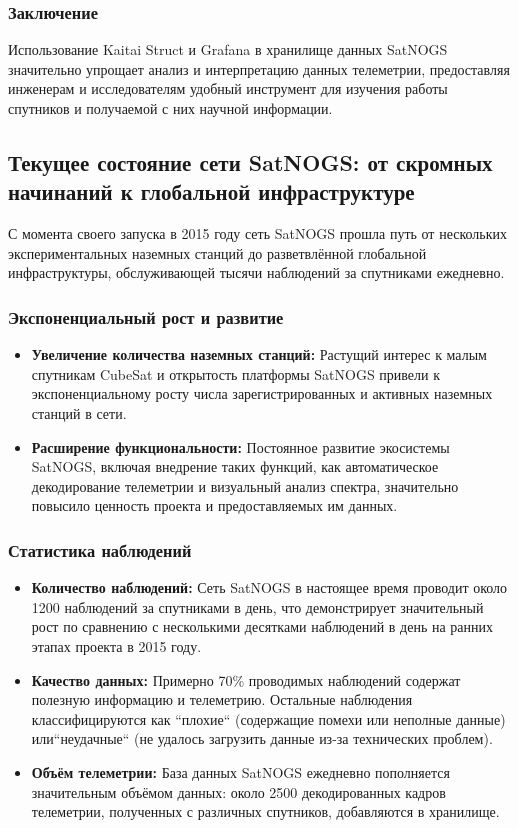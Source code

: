 \documentclass[14pt, a4paper]{extreport}
\begin{document}
    \subsubsection{Заключение}

    Использование Kaitai Struct и Grafana в хранилище данных SatNOGS значительно упрощает анализ и интерпретацию данных телеметрии, предоставляя инженерам и исследователям удобный инструмент для изучения работы спутников и получаемой с них научной информации.

    \subsection{Текущее состояние сети SatNOGS: от скромных начинаний к глобальной инфраструктуре}

    С момента своего запуска в 2015 году сеть SatNOGS прошла путь от нескольких экспериментальных наземных станций до разветвлённой глобальной инфраструктуры, обслуживающей тысячи наблюдений за спутниками ежедневно.

    \subsubsection{Экспоненциальный рост и развитие}

    \begin{itemize}
        \item \textbf{Увеличение количества наземных станций:} Растущий интерес к малым спутникам CubeSat и открытость платформы SatNOGS привели к экспоненциальному росту числа зарегистрированных и активных наземных станций в сети.
        \item \textbf{Расширение функциональности:}  Постоянное развитие экосистемы SatNOGS, включая внедрение таких функций, как автоматическое декодирование телеметрии и визуальный анализ спектра,  значительно повысило ценность проекта и предоставляемых им данных.
    \end{itemize}

    \subsubsection{Статистика наблюдений}

    \begin{itemize}
        \item \textbf{Количество наблюдений:} Сеть SatNOGS в настоящее время проводит около 1200 наблюдений за спутниками в день, что демонстрирует значительный рост по сравнению с несколькими десятками наблюдений в день на ранних этапах проекта в 2015 году.
        \item \textbf{Качество данных:} Примерно 70\% проводимых наблюдений содержат полезную информацию и телеметрию.
        Остальные наблюдения классифицируются как ``плохие`` (содержащие помехи или неполные данные) или``неудачные`` (не удалось загрузить данные из-за технических проблем).
        \item \textbf{Объём телеметрии:}  База данных SatNOGS ежедневно пополняется значительным объёмом данных: около 2500 декодированных кадров телеметрии, полученных с различных спутников,  добавляются в хранилище.
    \end{itemize}
\end{document}
